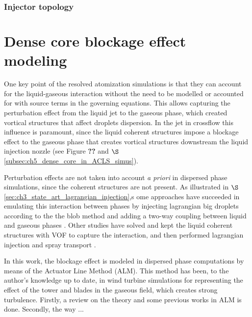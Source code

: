 \subsubsection*{Injector topology}



\section{Dense core blockage effect modeling}
	\label{sec:ch4_dense_core_modelling}
	
One key point of the resolved atomization simulations is that they can account for the liquid-gaseous interaction without the need to be modelled or accounted for with source terms in the governing equations. This allows capturing the perturbation effect from the liquid jet to the gaseous phase, which created vortical structures that affect droplets dispersion. In the jet in crossflow this influence is paramount, since the liquid coherent structures impose a blockage effect to the gaseous phase that creates vortical structures downstream the liquid injection nozzle (see Figure \textbf{??} and $\S$\ref{subsec:ch5_dense_core_in_ACLS_simus}).

Perturbation effects are not taken into account \textsl{a priori} in dispersed phase simulations, since the coherent structures are not present. As illustrated in $\S$\ref{sec:ch3_state_art_lagrangian_injection},s ome approaches have succeeded in emulating this interaction between phases by injecting lagrangian big droplets according to the the blob method  and adding a two-way coupling between liquid and gaseous phases . Other studies have solved and kept the liquid coherent structures with VOF to capture the interaction, and then performed lagrangian injection and spray transport .

In this work, the blockage effect is modeled in dispersed phase computations by means of the Actuator Line Method (ALM). This method has been, to the author's knowledge up to date, in wind turbine simulations for representing the effect of the tower and blades in the gaseous field, which creates strong turbulence. Firstly, a review on the theory and some previous works in ALM is done. Secondly, the way ...



